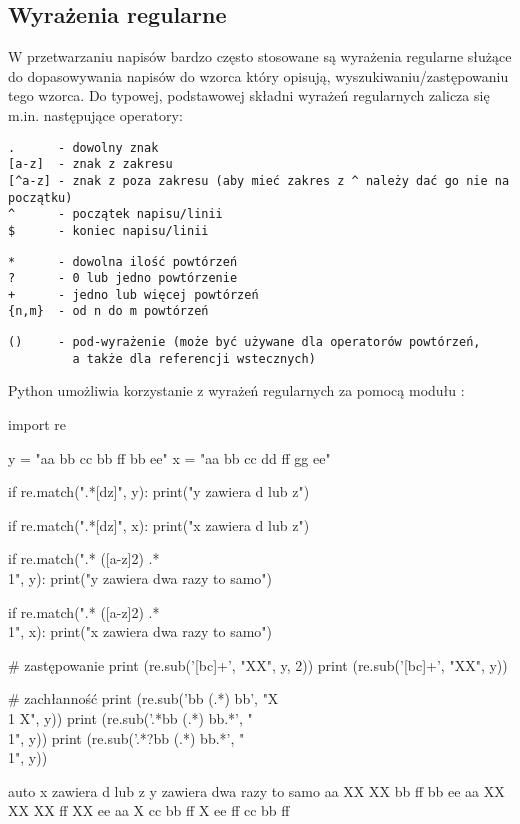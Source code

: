 \documentclass{pdfBooklets}
\begin{document}

\subsection{Wyrażenia regularne {\Symbola 🤔}}

W przetwarzaniu napisów bardzo często stosowane są wyrażenia regularne służące do dopasowywania napisów do wzorca który opisują, wyszukiwaniu/zastępowaniu tego wzorca. Do typowej, podstawowej składni wyrażeń regularnych zalicza się m.in. następujące operatory:

\vspace{-6pt}\begin{Verbatim}
.      - dowolny znak
[a-z]  - znak z zakresu
[^a-z] - znak z poza zakresu (aby mieć zakres z ^ należy dać go nie na początku)
^      - początek napisu/linii
$      - koniec napisu/linii
\end{Verbatim}
\vspace{-8pt}\begin{Verbatim}
*      - dowolna ilość powtórzeń
?      - 0 lub jedno powtórzenie
+      - jedno lub więcej powtórzeń
{n,m}  - od n do m powtórzeń
\end{Verbatim}
\vspace{-8pt}\begin{Verbatim}
()     - pod-wyrażenie (może być używane dla operatorów powtórzeń,
         a także dla referencji wstecznych)
\end{Verbatim}

\pagebreak[2]\noindent
Python umożliwia korzystanie z wyrażeń regularnych za pomocą modułu :

\begin{CodeFrame}[python]{0.57\textwidth}
import re

y = "aa bb cc bb ff bb ee"
x = "aa bb cc dd ff gg ee"

if re.match(".*[dz]", y):
  print("y zawiera d lub z")

if re.match(".*[dz]", x):
  print("x zawiera d lub z")

if re.match(".* ([a-z]{2}) .* \\1", y):
  print("y zawiera dwa razy to samo")

if re.match(".* ([a-z]{2}) .* \\1", x):
  print("x zawiera dwa razy to samo")

# zastępowanie
print (re.sub('[bc]+', "XX", y, 2))
print (re.sub('[bc]+', "XX", y))

# zachłanność
print (re.sub('bb (.*) bb', "X \\1 X", y))
print (re.sub('.*bb (.*) bb.*', "\\1", y))
print (re.sub('.*?bb (.*) bb.*', "\\1", y))
\end{CodeFrame}
\begin{CodeFrame}{auto}
x zawiera d lub z
y zawiera dwa razy to samo
aa XX XX bb ff bb ee
aa XX XX XX ff XX ee
aa X cc bb ff X ee
ff
cc bb ff
\end{CodeFrame}
\end{document}

